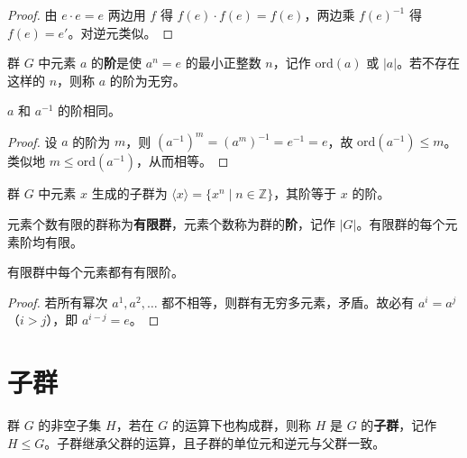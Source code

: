 \begin{proof}
由 $e \cdot e = e$ 两边用 $f$ 得 $f(e) \cdot f(e) = f(e)$，两边乘 $f(e)^{-1}$ 得 $f(e) = e'$。对逆元类似。
\end{proof}

\begin{definition}[元素的阶（定义 1.20）]
群 $G$ 中元素 $a$ 的\textbf{阶}是使 $a^n = e$ 的最小正整数 $n$，记作 $\mathrm{ord}(a)$ 或 $|a|$。若不存在这样的 $n$，则称 $a$ 的阶为无穷。
\end{definition}

\begin{proposition}
$a$ 和 $a^{-1}$ 的阶相同。
\end{proposition}

\begin{proof}
设 $a$ 的阶为 $m$，则 $(a^{-1})^m = (a^m)^{-1} = e^{-1} = e$，故 $\mathrm{ord}(a^{-1}) \le m$。类似地 $m \le \mathrm{ord}(a^{-1})$，从而相等。
\end{proof}

\begin{definition}[由元素生成的子群（定义 1.23）]
群 $G$ 中元素 $x$ 生成的子群为 $\langle x \rangle = \{x^n \mid n \in \mathbb{Z}\}$，其阶等于 $x$ 的阶。
\end{definition}

\begin{definition}[有限群与阶]
元素个数有限的群称为\textbf{有限群}，元素个数称为群的\textbf{阶}，记作 $|G|$。有限群的每个元素阶均有限。
\end{definition}

\begin{proposition}
有限群中每个元素都有有限阶。
\end{proposition}

\begin{proof}
若所有幂次 $a^1, a^2, \ldots$ 都不相等，则群有无穷多元素，矛盾。故必有 $a^i = a^j$（$i > j$），即 $a^{i-j} = e$。
\end{proof}

\section{子群}

\begin{definition}[子群（定义 1.13）]
群 $G$ 的非空子集 $H$，若在 $G$ 的运算下也构成群，则称 $H$ 是 $G$ 的\textbf{子群}，记作 $H \le G$。子群继承父群的运算，且子群的单位元和逆元与父群一致。
\end{definition}

